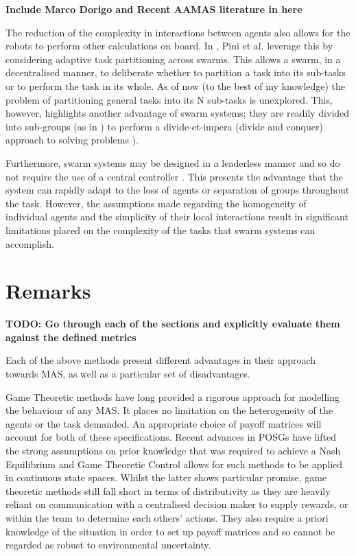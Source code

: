 \documentclass[.../main.tex]{subfiles}
\begin{document}
\textbf{Include Marco Dorigo and Recent AAMAS literature in here}

The reduction of the complexity in interactions between agents also allows for the robots to perform
other calculations on board. In \cite{Pini2011TaskSelection}, Pini et al. leverage this by
considering adaptive task partitioning across swarms. This allows a swarm, in a decentralised
manner, to deliberate whether to partition a task into its sub-tasks or to perform the task in its
whole. As of now (to the best of my knowledge) the problem of partitioning general tasks into its N
sub-tasks is unexplored. This, however, highlights another advantage of swarm systems; they are
readily divided into sub-groups (as in \cite{Zahadat2016DivisionInhibition}) to perform a
divide-et-impera (divide and conquer) approach to solving problems \cite{Pini2011TaskSelection}). 

Furthermore, swarm systems may be designed in a leaderless manner and so do not require the use of a
central controller \cite{Couceiro2015}. This presents the advantage that the system can rapidly
adapt to the loss of agents or separation of groups throughout the task. However, the assumptions
made regarding the homogeneity of individual agents and the simplicity of their local interactions
result in significant limitations placed on the complexity of the tasks that swarm systems can
accomplish.


\section{Remarks} \label{sec:remarks}

\textbf{TODO: Go through each of the sections and explicitly evaluate them against the defined
metrics}

Each of the above methods present different advantages in their approach towards MAS, as well as a
particular set of disadvantages. 

Game Theoretic methods have long provided a rigorous approach for
modelling the behaviour of any MAS. It places no limitation on the heterogeneity of the agents or
the task demanded. An appropriate choice of payoff matrices will account for both of these
specifications. Recent advances in POSGs have lifted the strong assumptions on prior knowledge that
was required to achieve a Nash Equilibrium and Game Theoretic Control allows for such methods to be
applied in continuous state spaces. Whilst the latter shows particular promise, game theoretic
methods still fall short in terms of distributivity as they are heavily reliant on communication
with a centralised decision maker to supply rewards, or within the team to determine each others'
actions. They also require a priori knowledge of the situation in order to set up payoff matrices
and so cannot be regarded as robust to environmental uncertainty.
\end{document}
